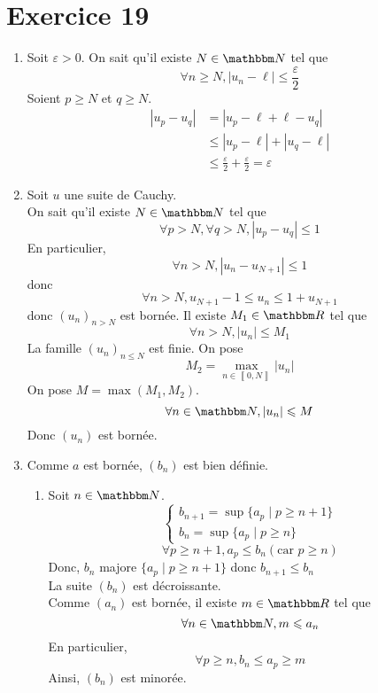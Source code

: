 \part{Exercice 19}

\begin{enumerate}
	\item Soit $\varepsilon > 0$. On sait qu'il existe $N \in \N$ tel que \[
			\forall n \ge N, \left| u_n - \ell \right| \le  \frac{\varepsilon}{2}
		\] Soient $p \ge N$ et $q \ge N$.
		\begin{align*}
			\left| u_p - u_q \right| &= \left| u_p - \ell + \ell - u_q \right|  \\
															 &\le  \left| u_p - \ell \right| + \left| u_q - \ell \right| \\
															 &\le \frac{\varepsilon}{2} + \frac{\varepsilon}{2} = \varepsilon
		\end{align*}
	\item Soit $u$ une suite de Cauchy.\\
		On sait qu'il existe $N \in \N$ tel que \[
			\forall p > N, \forall q > N, \left| u_p - u_q \right| \le 1
		\] En particulier, \[
		\forall n > N, \left| u_n - u_{N+1} \right| \le 1
		\] donc  \[
		\forall n > N, u_{N+1} - 1 \le u_n \le 1 + u_{N+1}
		\]
		donc $(u_n)_{n > N}$ est bornée. Il existe $M_1 \in \R$ tel que \[
			\forall n > N, \left| u_n \right| \le M_1
		\] La famille $(u_n)_{n \le N}$ est finie. On pose \[
		M_2 = \max_{n \in \left\llbracket 0,N \right\rrbracket} \left| u_n \right|
		\] On pose $M = \max(M_1, M_2)$. \[
		\forall n \in \N, \left| u_n \right| \le M
		\] Donc $(u_n)$ est bornée.
	\item Comme $a$ est bornée, $(b_n)$ est bien définie.
		\begin{enumerate}
			\item Soit $n \in \N$. \[
						\begin{cases}
							b_{n+1} = \sup \{a_p  \mid  p \ge n+1\} \\
							b_n = \sup \{a_p  \mid  p \ge n\} 
						\end{cases}
				\]\[
					\forall p \ge n+1, a_p \le b_n (\text{car } p \ge n)
				\]
				Donc, $b_n$ majore $\{a_p  \mid  p \ge n+1\}$ donc $b_{n+1} \le b_n$ \\
				La suite $(b_n)$ est décroissante.\\
				Comme $(a_n)$ est bornée, il existe $m \in \R$ tel que \[
					\forall n \in \N, m \le a_n
				\]
				En particulier, \[
					\forall p \ge n, b_n \le a_p \ge m
				\] Ainsi, $(b_n)$ est minorée.\\

\end{enumerate}
\end{enumerate}
